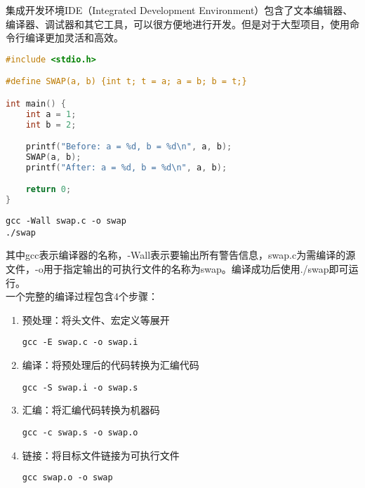 集成开发环境IDE（Integrated Development Environment）包含了文本编辑器、编译器、调试器和其它工具，可以很方便地进行开发。但是对于大型项目，使用命令行编译更加灵活和高效。\\


\begin{lstlisting}[language=C]
#include <stdio.h>

#define SWAP(a, b) {int t; t = a; a = b; b = t;}

int main() {
    int a = 1;
    int b = 2;

    printf("Before: a = %d, b = %d\n", a, b);
    SWAP(a, b);
    printf("After: a = %d, b = %d\n", a, b);

    return 0;
}
\end{lstlisting}

\vspace{-0.5cm}

\begin{lstlisting}
gcc -Wall swap.c -o swap
./swap
\end{lstlisting}

其中gcc表示编译器的名称，-Wall表示要输出所有警告信息，swap.c为需编译的源文件，-o用于指定输出的可执行文件的名称为swap。编译成功后使用./swap即可运行。\\

一个完整的编译过程包含4个步骤：

\begin{enumerate}
    \item 预处理：将头文件、宏定义等展开
          \vspace{-0.5cm}
          \begin{lstlisting}
gcc -E swap.c -o swap.i
            \end{lstlisting}

    \item 编译：将预处理后的代码转换为汇编代码
          \vspace{-0.5cm}
          \begin{lstlisting}
gcc -S swap.i -o swap.s
            \end{lstlisting}

    \item 汇编：将汇编代码转换为机器码
          \vspace{-0.5cm}
          \begin{lstlisting}
gcc -c swap.s -o swap.o
            \end{lstlisting}

    \item 链接：将目标文件链接为可执行文件
          \vspace{-0.5cm}
          \begin{lstlisting}
gcc swap.o -o swap
            \end{lstlisting}
\end{enumerate}

